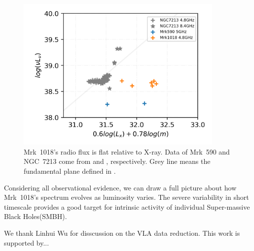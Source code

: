\documentclass{aastex63}
\begin{document}
\begin{figure}
\centering
	\includegraphics[width=0.9\textwidth]{./pic/Mrk1018_ngc7213_radio_xray_mass_log_merloni03.png}
    \caption{Mrk~1018's radio flux is flat relative to X-ray. Data of Mrk~590 and NGC~7213 come from \citet{2016MNRAS.460..304K} and \citet{2011MNRAS.411..402B}, respectively. Grey line means the fundamental plane defined in \citet{2003MNRAS.345.1057M}.}
    \label{fig:radio-xray-mass_relation_plus_ngc7213}
\end{figure}


 



Considering all observational evidence, we can draw a full picture about how Mrk~1018's spectrum evolves as luminosity varies. The severe variability in short timescale provides a good target for intrinsic activity of individual Super-massive Black Holes(SMBH). 



\acknowledgments

We thank Linhui Wu for disscussion on the VLA data reduction. This work is supported by...

%
\end{document}
